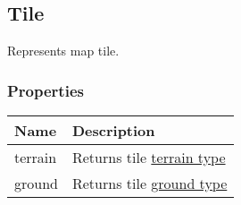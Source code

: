 \subsection{Tile}
\label{Tile}
Represents map tile.
\subsubsection{Properties}
\begin{center}
\begin{tabularx}{\linewidth}{| l | X |}
\hline
\textbf{Name} & \textbf{Description} \\
\hline
terrain & Returns tile \hyperref[TerrainCategory]{terrain type}\\
\hline
ground & Returns tile \hyperref[GroundCategory]{ground type}\\
\hline
\end{tabularx}
\end{center}